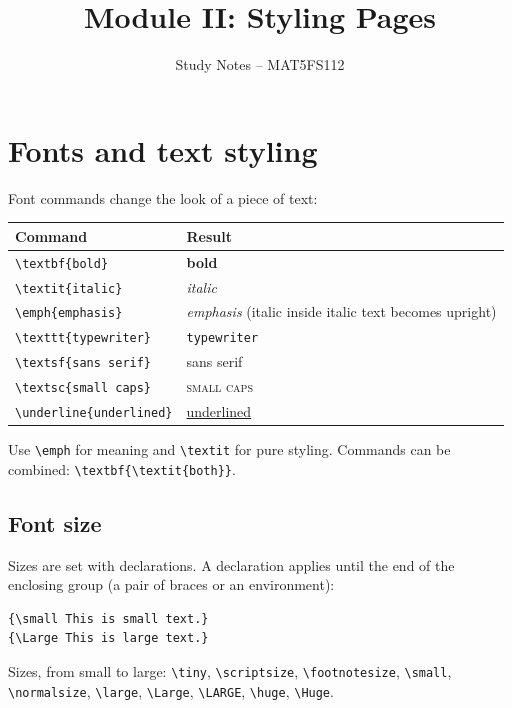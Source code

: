 \documentclass[11pt,a4paper]{article}
\title{Module II: Styling Pages}
\author{Study Notes -- MAT5FS112}
\date{}
\begin{document}
\maketitle

\section{Fonts and text styling}

Font commands change the look of a piece of text:
\begin{center}
\begin{tabular}{ll}
\toprule
Command & Result \\
\midrule
\verb|\textbf{bold}| & \textbf{bold} \\
\verb|\textit{italic}| & \textit{italic} \\
\verb|\emph{emphasis}| & \emph{emphasis} (italic inside italic text becomes upright) \\
\verb|\texttt{typewriter}| & \texttt{typewriter} \\
\verb|\textsf{sans serif}| & \textsf{sans serif} \\
\verb|\textsc{small caps}| & \textsc{small caps} \\
\verb|\underline{underlined}| & \underline{underlined} \\
\bottomrule
\end{tabular}
\end{center}

Use \verb|\emph| for meaning and \verb|\textit| for pure styling.
Commands can be combined: \verb|\textbf{\textit{both}}|.

\subsection{Font size}

Sizes are set with declarations. A declaration applies until the end of
the enclosing group (a pair of braces or an environment):
\begin{verbatim}
{\small This is small text.}
{\Large This is large text.}
\end{verbatim}

Sizes, from small to large: \verb|\tiny|, \verb|\scriptsize|,
\verb|\footnotesize|, \verb|\small|, \verb|\normalsize|, \verb|\large|,
\verb|\Large|, \verb|\LARGE|, \verb|\huge|, \verb|\Huge|.
\end{document}
